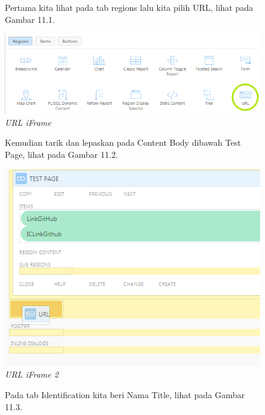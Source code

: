 \begin{enumerate}
\begin{figure}
    \item Pertama kita lihat pada tab regions lalu kita pilih URL, lihat pada Gambar 11.1.
        
        \centering
        \includegraphics[scale=0.5]{figures/bab12/1.png}
        \caption{\textit{URL iFrame}}
        \label{URL iFrame}
    \end{figure}
    
    \begin{figure}
    \item Kemudian tarik dan lepaskan pada Content Body dibawah Test Page, lihat pada Gambar 11.2.
        
        \centering
        \includegraphics[scale=0.5]{figures/bab12/2.png}
        \caption{\textit{URL iFrame 2}}
        \label{URL iFrame 2}
    \end{figure}
    
    \begin{figure}
    \item Pada tab Identification kita beri Nama Title, lihat pada Gambar 11.3.
        

\end{figure}
\end{enumerate}
